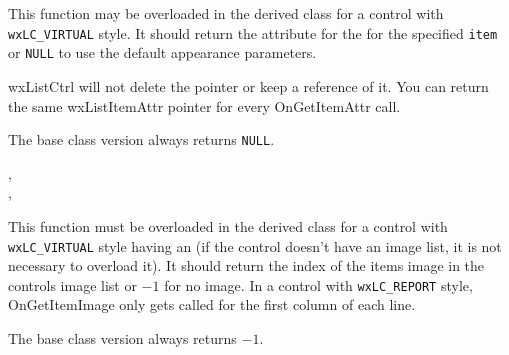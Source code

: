 

\label{wxlistctrlongetitemattr}


This function may be overloaded in the derived class for a control with
{\tt wxLC\_VIRTUAL} style. It should return the attribute for the
for the specified {\tt item} or {\tt NULL} to use the default appearance
parameters.

wxListCtrl will not delete the pointer or keep a reference of it. You can 
return the same wxListItemAttr pointer for every OnGetItemAttr call.

The base class version always returns {\tt NULL}.


,\\
,\\


\label{wxlistctrlongetitemimage}


This function must be overloaded in the derived class for a control with
{\tt wxLC\_VIRTUAL} style having an 
(if the control doesn't have an image list, it is not necessary to overload
 it). It should return the index of the items image in the controls image list
or $-1$ for no image.
In a control with {\tt wxLC\_REPORT} style, OnGetItemImage only gets called for
the first column of each line.

The base class version always returns $-1$.


